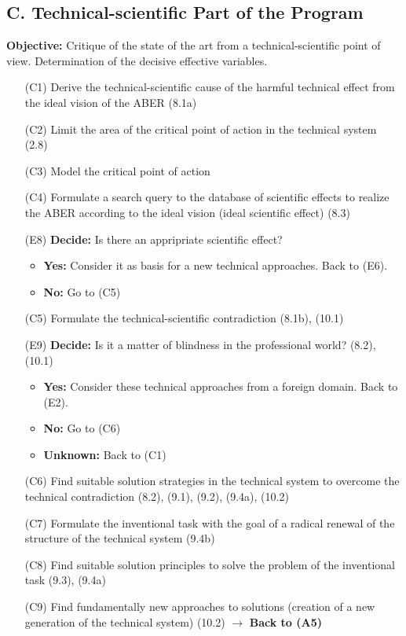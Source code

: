 \documentclass[11pt,a4paper]{article}
\begin{document}
\subsection*{C. Technical-scientific Part of the Program}

\textbf{Objective:} Critique of the state of the art from a
technical-scientific point of view.  Determination of the decisive effective
variables.

\begin{itemize}[leftmargin=30pt]
\item[(C1)] Derive the technical-scientific cause of the harmful technical
  effect from the ideal vision of the ABER (8.1a)
\item[(C2)] Limit the area of the critical point of action in the technical
  system (2.8)
\item[(C3)] Model the critical point of action
\item[(C4)] Formulate a search query to the database of scientific effects to
  realize the ABER according to the ideal vision (ideal scientific effect)
  (8.3)
\item[(E8)] \textbf{Decide:} Is there an appripriate scientific effect?
  \begin{itemize}[leftmargin=20pt,noitemsep]
  \item \textbf{Yes:} Consider it as basis for a new technical approaches.
    Back to (E6).
  \item \textbf{No:} Go to (C5)
  \end{itemize}
\item[(C5)] Formulate the technical-scientific contradiction (8.1b), (10.1)
\item[(E9)] \textbf{Decide:} Is it a matter of blindness in the professional
  world?  (8.2), (10.1)
  \begin{itemize}[leftmargin=20pt,noitemsep]
  \item \textbf{Yes:} Consider these technical approaches from a foreign
    domain.  Back to (E2).
  \item \textbf{No:} Go to (C6)
  \item \textbf{Unknown:} Back to (C1)
  \end{itemize}
\item[(C6)] Find suitable solution strategies in the technical system to
  overcome the technical contradiction (8.2), (9.1), (9.2), (9.4a), (10.2)
\item[(C7)] Formulate the inventional task with the goal of a radical
  renewal of the structure of the technical system (9.4b)
\item[(C8)] Find suitable solution principles to solve the problem of the
  inventional task (9.3), (9.4a)
\item[(C9)] Find fundamentally new approaches to solutions (creation of a new
  generation of the technical system) (10.2) $\to$ \textbf{Back to (A5)}
\end{itemize}
\end{document}
